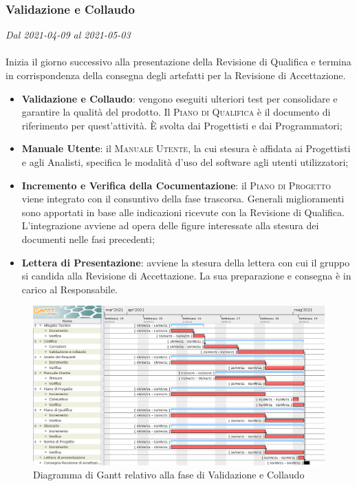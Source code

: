 \subsubsection{Validazione e Collaudo}

\textit{Dal 2021-04-09 al 2021-05-03}
\\\\
Inizia il giorno successivo alla presentazione della Revisione di Qualifica e termina in corrispondenza della consegna degli artefatti per la Revisione di Accettazione.
\begin{itemize}
	\item \textbf{Validazione e Collaudo}: vengono eseguiti ulteriori test per consolidare e garantire la qualità del prodotto. Il \textsc{Piano di Qualifica} è il documento di riferimento per quest'attività. \`E svolta dai Progettisti e dai Programmatori;
	\item \textbf{Manuale Utente}: il \textsc{Manuale Utente}, la cui stesura è affidata ai Progettisti e agli Analisti, specifica le modalità d'uso del software agli utenti utilizzatori;
	\item \textbf{Incremento e Verifica della Cocumentazione}: il \textsc{Piano di Progetto} viene integrato con il consuntivo della fase trascorsa. Generali miglioramenti sono apportati in base alle indicazioni ricevute con la Revisione di Qualifica. L'integrazione avviene ad opera delle figure interessate alla stesura dei documenti nelle fasi precedenti;
	\item \textbf{Lettera di Presentazione}: avviene la stesura della lettera con cui il gruppo si candida alla Revisione di Accettazione. La sua preparazione e consegna è in carico al Responsabile.
\end{itemize}

\begin{figure}[H]
	\centering
	\includegraphics[scale=0.51]{res/images/06_gantt_validazione}
	\caption{Diagramma di Gantt relativo alla fase di Validazione e Collaudo}
\end{figure}